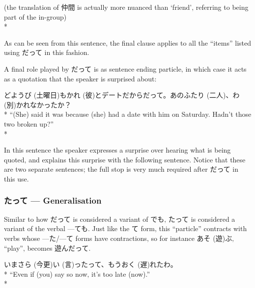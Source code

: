 \documentclass[11pt, b5paper, twoside, openright, onecolumn]{book}
\makeatletter
\newcommand*{\rubystack}[2]{{\relscale{0.5}%
  \begin{tabular}[b]{@{}c@{}}%
    {#1}\\%
   {\textscale{2}{#2}}%
  \end{tabular}}%
}
\DeclareRobustCommand*{\ruby}[2]{%
  \mbox{%
    \setlength{\parskip}{0ex}%
    \BeginAccSupp{method=pdfstringdef,ActualText={#1}}%
      \rubystack{\phantom{#2}}{#1}%
      \llap{%
        \rubystack{#2}{\phantom{#1}}%
      }%
    \EndAccSupp{}%
  }%
}
\renewcommand*{\ruby}[2]{#2 (#1)}%
\newenvironment{exampleblock}{
\setlength{\parindent}{0.6in}
\begin{minipage}[t]{\dimexpr\textwidth-\parindent}}
{\end{minipage}}
\makeatother
\begin{document}
\begin{exampleblock}
(the translation of 仲間 is actually more nuanced than ‘friend’‚ referring to being part of the in-group) \\* 
\end{exampleblock}
\vspace{0.2cm}

As can be seen from this sentence‚ the final clause applies to all the “items” listed using だって in this fashion.

A final role played by だって is as sentence ending particle‚ in which case it acts as a quotation that the speaker is surprised about:

\vspace{0.4cm}
\begin{exampleblock}
\ruby{土曜日}{どようび}も\ruby{彼}{かれ}とデートだからだって。あの\ruby{二人}{ふたり}、\ruby{別}{わ}かれなかったか？ \\* 
“(She) said it was because (she) had a date with him on Saturday. Hadn’t those two broken up?” \\* 
\end{exampleblock}
\vspace{0.2cm}

In this sentence the speaker expresses a surprise over hearing what is being quoted‚ and explains this surprise with the following sentence. Notice that these are two separate sentences; the full stop is very much required after だって in this use.

\subsubsection{たって — Generalisation}

Similar to how だって is considered a variant of でも‚ たって is considered a variant of the verbal —ても. Just like the て form‚ this “particle” contracts with verbs whose —た/—て forms have contractions‚ so for instance \ruby{遊}{あそ}ぶ‚ “play”‚ becomes 遊んだって.

\vspace{0.4cm}
\begin{exampleblock}
\ruby{今更}{いまさら}\ruby{言}{い}ったって、もう\ruby{遅}{おく}れたわ。 \\* 
“Even if (you) say so now‚ it’s too late (now).” \\* 
\end{exampleblock}
\vspace{0.2cm}
\end{document}
